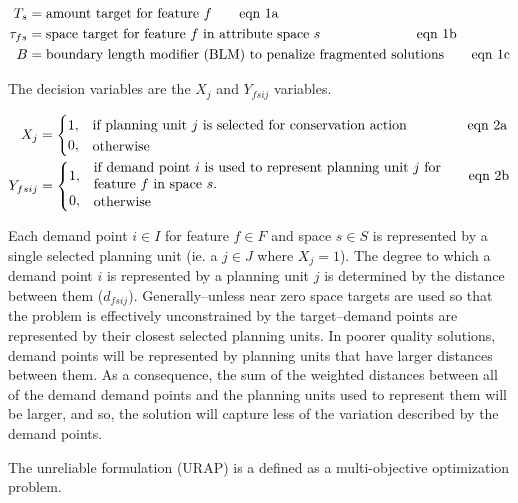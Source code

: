 \begin{align*}
T_s &= \text{amount target for feature $f$} \tag*{eqn 1a}\\
%
\tau_{fs} &= \parbox{25em}{space target for feature $f$ in attribute space $s$} \tag*{eqn 1b}\\
%
B &= \text{boundary length modifier (BLM) to penalize fragmented solutions} \tag*{eqn 1c}\\
\end{align*}

The decision variables are the \(X_j\) and \(Y_{fsij}\) variables.

\begin{align*}
X_j
  &= \begin{cases}
    1, & \parbox{25em}{if planning unit $j$ is selected for conservation action} \tag*{eqn 2a} \\
    0, & \parbox{25em}{otherwise} \\
  \end{cases} \\
%
Y_{fsij} &= \begin{cases}
    1, & \parbox{25em}{if demand point $i$ is used to represent planning unit $j$ for feature $f$ in space $s$. } \tag*{eqn 2b} \\
    0, & \parbox{25em}{otherwise} \\
  \end{cases} \\
\end{align*}

Each demand point \(i \in I\) for feature \(f \in F\) and space
\(s \in S\) is represented by a single selected planning unit (ie. a
\(j \in J\) where \(X_j = 1\)). The degree to which a demand point \(i\)
is represented by a planning unit \(j\) is determined by the distance
between them (\(d_{fsij}\)). Generally--unless near zero space targets
are used so that the problem is effectively unconstrained by the
target--demand points are represented by their closest selected planning
units. In poorer quality solutions, demand points will be represented by
planning units that have larger distances between them. As a
consequence, the sum of the weighted distances between all of the demand
demand points and the planning units used to represent them will be
larger, and so, the solution will capture less of the variation
described by the demand points.

The unreliable formulation (URAP) is a defined as a multi-objective
optimization problem.

